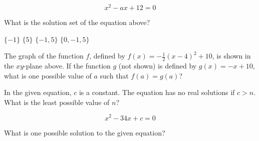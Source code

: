 \[
x^{2}-a x+12=0
\]

\begin{solutionorbox}[1in]
\end{solutionorbox}

\question[1]
What is the solution set of the equation above?
\begin{choices}
  \choice $\{-1\}$
  \choice $\{5\}$
  \CorrectChoice $\{-1,5\}$
  \choice $\{0,-1,5\}$
\end{choices}

\newpage

\begin{center}
\end{center}

\question[1]
The graph of the function $f$, defined by $f(x)=-\frac{1}{2}(x-4)^{2}+10$, is shown in the $x y$-plane above. If the function $g$ (not shown) is defined by $g(x)=-x+10$, what is one possible value of $a$ such that $f(a)=g(a)$?

\begin{solutionorbox}[1in]
\end{solutionorbox}

\question[1]
In the given equation, $c$ is a constant. The equation has no real solutions if $c>n$. What is the least possible value of $n$?

\[
x^{2}-34 x+c=0
\]

\begin{solutionorbox}[1in]
\end{solutionorbox}

\question[1]
What is one possible solution to the given equation?

